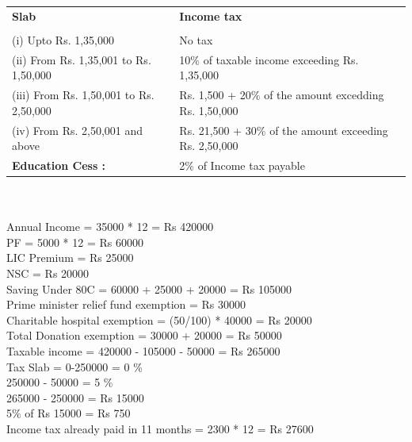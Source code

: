 \documentclass[journal,12pt,twocolumn]{IEEEtran}
\renewcommand\thesection{\arabic{section}}
\begin{document}
\begin{enumerate}[label=\thesection.\arabic*.,ref=\thesection.\theenumi]
\begin{table}[ht]
\begin{tabular}{p{}p{}}
    \textbf{Slab} & \textbf{Income tax} \\ \\
    (i) Upto Rs. 1,35,000 & No tax \\ 
    (ii) From Rs. 1,35,001 to Rs. 1,50,000 & 10\% of taxable income exceeding Rs. 1,35,000 \\ 
    (iii) From Rs. 1,50,001 to Rs. 2,50,000 & Rs. 1,500 + 20\% of the  amount excedding Rs. 1,50,000 \\
    (iv) From Rs. 2,50,001 and above & Rs. 21,500 + 30\% of the amount  exceeding Rs. 2,50,000 \\
    \textbf{Education Cess :} & 2\% of Income tax payable
    \end{tabular}
\end{table}\\
 \solution\\
 Annual Income = 35000 * 12 = Rs 420000\\
PF = 5000 * 12 = Rs 60000\\
LIC Premium = Rs 25000\\
NSC = Rs 20000\\
Saving Under 80C = 60000 + 25000 + 20000 = Rs 105000\\
Prime minister relief fund exemption = Rs  30000\\
Charitable hospital exemption = (50/100) * 40000 = Rs 20000\\
Total Donation exemption = 30000 + 20000 = Rs 50000\\
Taxable income = 420000 - 105000 - 50000 = Rs 265000\\
Tax Slab = 0-250000 =  0 \% \\
250000 - 50000 =  5 \% \\
265000 - 250000 = Rs 15000 \\
5\% of Rs 15000 = Rs 750 \\
Income tax already paid in 11 months = 2300 * 12 = Rs 27600\\ 
 \end{enumerate}
\end{document}
